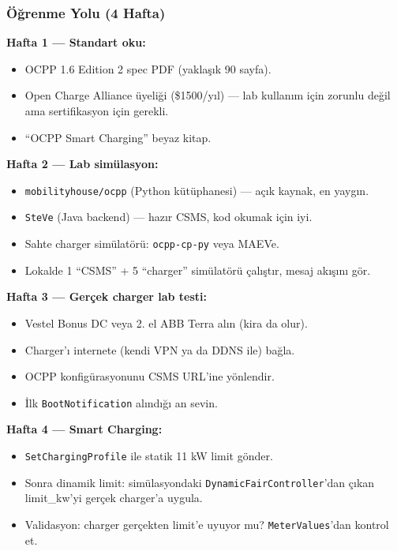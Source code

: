 \documentclass[11pt,a4paper]{article}
\begin{document}
\subsubsection{Öğrenme Yolu (4 Hafta)}

\textbf{Hafta 1 — Standart oku:}
\begin{itemize}
    \item OCPP 1.6 Edition 2 spec PDF (yaklaşık 90 sayfa).
    \item Open Charge Alliance üyeliği (\$1500/yıl) — lab kullanım için zorunlu değil ama sertifikasyon için gerekli.
    \item ``OCPP Smart Charging'' beyaz kitap.
\end{itemize}

\textbf{Hafta 2 — Lab simülasyon:}
\begin{itemize}
    \item \texttt{mobilityhouse/ocpp} (Python kütüphanesi) — açık kaynak, en yaygın.
    \item \texttt{SteVe} (Java backend) — hazır CSMS, kod okumak için iyi.
    \item Sahte charger simülatörü: \texttt{ocpp-cp-py} veya MAEVe.
    \item Lokalde 1 ``CSMS'' + 5 ``charger'' simülatörü çalıştır, mesaj akışını gör.
\end{itemize}

\textbf{Hafta 3 — Gerçek charger lab testi:}
\begin{itemize}
    \item Vestel Bonus DC veya 2. el ABB Terra alın (kira da olur).
    \item Charger'ı internete (kendi VPN ya da DDNS ile) bağla.
    \item OCPP konfigürasyonunu CSMS URL'ine yönlendir.
    \item İlk \texttt{BootNotification} alındığı an sevin.
\end{itemize}

\textbf{Hafta 4 — Smart Charging:}
\begin{itemize}
    \item \texttt{SetChargingProfile} ile statik 11 kW limit gönder.
    \item Sonra dinamik limit: simülasyondaki \texttt{DynamicFairController}'dan çıkan limit\_kw'yi gerçek charger'a uygula.
    \item Validasyon: charger gerçekten limit'e uyuyor mu? \texttt{MeterValues}'dan kontrol et.
\end{itemize}
\end{document}
